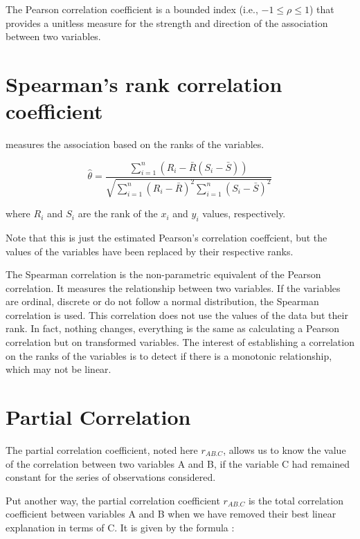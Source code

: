 \documentclass[
]{report}
\begin{document}
The Pearson correlation coefficient is a bounded index (i.e., \(-1 \leq \rho \leq 1\)) that provides a unitless measure for the strength and direction of the association between two variables.

\hypertarget{spearmans-rank-correlation-coefficient}{%
\section{Spearman's rank correlation coefficient}\label{spearmans-rank-correlation-coefficient}}

measures the association based on the ranks of the variables.

\[\hat{\theta}=\frac{\sum_{i=1}^n(R_i-\bar{R}(S_i-\bar{S}))}{\sqrt{\sum_{i=1}^n(R_i-\bar{R})^2\sum_{i=1}^n(S_i-\bar{S})^2}}\]

where \(R_i\) and \(S_i\) are the rank of the \(x_i\) and \(y_i\) values, respectively.

Note that this is just the estimated Pearson's correlation coeffcient, but the values of the variables have been replaced by their respective ranks.

The Spearman correlation is the non-parametric equivalent of the Pearson correlation. It measures the relationship between two variables. If the variables are ordinal, discrete or do not follow a normal distribution, the Spearman correlation is used. This correlation does not use the values of the data but their rank.
In fact, nothing changes, everything is the same as calculating a Pearson correlation but on transformed variables.
The interest of establishing a correlation on the ranks of the variables is to detect if there is a monotonic relationship, which may not be linear.

\hypertarget{partial-correlation}{%
\section{Partial Correlation}\label{partial-correlation}}

The partial correlation coefficient, noted here \(r_{AB.C}\), allows us to know the value of the correlation between two variables A and B, if the variable C had remained constant for the series of observations considered.

Put another way, the partial correlation coefficient \(r_{AB.C}\) is the total correlation coefficient between variables A and B when we have removed their best linear explanation in terms of C. It is given by the formula :
\end{document}
